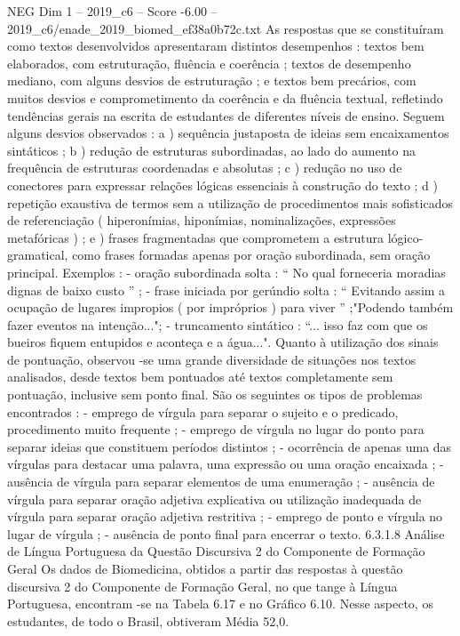 \begin{textsample}{NEG Dim 1 – 2019\_c6 – Score -6.00 – 2019\_c6/enade\_2019\_biomed\_ef38a0b72c.txt}
As respostas que se constituíram como textos desenvolvidos apresentaram distintos desempenhos : textos bem elaborados, com estruturação, fluência e coerência ; textos de desempenho mediano, com alguns desvios de estruturação ; e textos bem precários, com muitos desvios e comprometimento da coerência e da fluência textual, refletindo tendências gerais na escrita de estudantes de diferentes níveis de ensino.
Seguem alguns desvios observados : a ) sequência justaposta de ideias sem encaixamentos sintáticos ; b ) redução de estruturas subordinadas, ao lado do aumento na frequência de estruturas coordenadas e absolutas ; c ) redução no uso de conectores para expressar relações lógicas essenciais à construção do texto ; d ) repetição exaustiva de termos sem a utilização de procedimentos mais sofisticados de referenciação ( hiperonímias, hiponímias, nominalizações, expressões metafóricas ) ; e ) frases fragmentadas que comprometem a estrutura lógico-gramatical, como frases formadas apenas por oração subordinada, sem oração principal.
Exemplos : - oração subordinada solta : “ No qual forneceria moradias dignas de baixo custo ” ; - frase iniciada por gerúndio solta : “ Evitando assim a ocupação de lugares impropios ( por impróprios ) para viver ” ;"Podendo também fazer eventos na intenção..."; - truncamento sintático : “... isso faz com que os bueiros fiquem entupidos e aconteça e a água...".
Quanto à utilização dos sinais de pontuação, observou -se uma grande diversidade de situações nos textos analisados, desde textos bem pontuados até textos completamente sem pontuação, inclusive sem ponto final.
São os seguintes os tipos de problemas encontrados : - emprego de vírgula para separar o sujeito e o predicado, procedimento muito frequente ; - emprego de vírgula no lugar do ponto para separar ideias que constituem períodos distintos ; - ocorrência de apenas uma das vírgulas para destacar uma palavra, uma expressão ou uma oração encaixada ; - ausência de vírgula para separar elementos de uma enumeração ; - ausência de vírgula para separar oração adjetiva explicativa ou utilização inadequada de vírgula para separar oração adjetiva restritiva ; - emprego de ponto e vírgula no lugar de vírgula ; - ausência de ponto final para encerrar o texto. 6.3.1.8 Análise de Língua Portuguesa da Questão Discursiva 2 do Componente de Formação Geral Os dados de Biomedicina, obtidos a partir das respostas à questão discursiva 2 do Componente de Formação Geral, no que tange à Língua Portuguesa, encontram -se na Tabela 6.17 e no Gráfico 6.10.
Nesse aspecto, os estudantes, de todo o Brasil, obtiveram Média 52,0.

\end{textsample}
